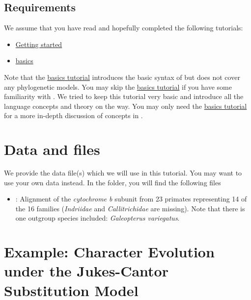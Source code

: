\subsection{Requirements}
We assume that you have read and hopefully completed the following tutorials:
\begin{itemize}
\item \href{https://github.com/revbayes/revbayes_tutorial/raw/master/tutorial_TeX/RB_Getting_Started/RB_Getting_Started.pdf}{Getting started}
\item \href{https://github.com/revbayes/revbayes_tutorial/raw/master/tutorial_TeX/RB_Basics_Tutorial/RB_Basics_Tutorial.pdf}{\Rev basics}
\end{itemize}
Note that the \href{https://github.com/revbayes/revbayes_tutorial/raw/master/tutorial_TeX/RB_Basics_Tutorial/RB_Basics_Tutorial.pdf}{\Rev basics tutorial} introduces the basic syntax of \Rev but does not cover any phylogenetic models.
You may skip the \href{https://github.com/revbayes/revbayes_tutorial/raw/master/tutorial_TeX/RB_Basics_Tutorial/RB_Basics_Tutorial.pdf}{\Rev basics tutorial} if you have some familiarity with \R.
We tried to keep this tutorial very basic and introduce all the language concepts and theory on the way.
You may only need the \href{https://github.com/revbayes/revbayes_tutorial/raw/master/tutorial_TeX/RB_Basics_Tutorial/RB_Basics_Tutorial.pdf}{\Rev basics tutorial} for a more in-depth discussion of concepts in \Rev.




\section{Data and files}

We provide the data file(s) which we will use in this tutorial.
You may want to use your own data instead.
In the  folder, you will find the following files
\begin{itemize}
\item
{}: Alignment of the \textit{cytochrome b} subunit from 23 primates representing 14 of the 16 families (\textit{Indriidae} and \textit{Callitrichidae} are missing). Note that there is one outgroup species included: \emph{Galeopterus variegatus}.
\end{itemize}



\section{Example: Character Evolution under the Jukes-Cantor Substitution Model}

